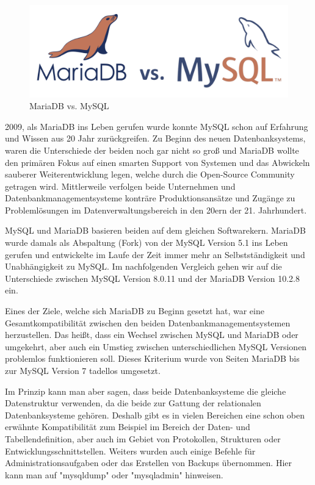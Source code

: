 
\begin{figure}[H]
    \centering
    \includegraphics[width=\textwidth]{media/MariaDB/mariavsmy.png}
    \caption{MariaDB vs. MySQL \cite{MariaVsMyBild}}
    \label{fig:MariavsMy}
\end{figure}

2009, als MariaDB ins Leben gerufen wurde konnte MySQL schon auf Erfahrung und Wissen aus 20 Jahr zurückgreifen. Zu Beginn des neuen Datenbanksystems, waren die Unterschiede der beiden noch gar nicht so groß und MariaDB wollte den primären Fokus auf einen smarten Support von Systemen und das Abwickeln sauberer Weiterentwicklung legen, welche durch die Open-Source Community getragen wird. Mittlerweile verfolgen beide Unternehmen und Datenbankmanagementsysteme konträre Produktionsansätze und Zugänge zu Problemlösungen im Datenverwaltungsbereich in den 20ern der 21. Jahrhundert. \cite{MariaVsMy}

MySQL und MariaDB basieren beiden auf dem gleichen Softwarekern. MariaDB wurde damals als Abspaltung (Fork) von der MySQL Version 5.1 ins Leben gerufen und entwickelte im Laufe der Zeit immer mehr an Selbstständigkeit und Unabhängigkeit zu MySQL. Im nachfolgenden Vergleich gehen wir auf die Unterschiede zwischen MySQL Version 8.0.11 und der MariaDB Version 10.2.8 ein. \cite{MariaVsMy}


Eines der Ziele, welche sich MariaDB zu Beginn gesetzt hat, war eine Gesamtkompatibilität zwischen den beiden Datenbankmanagementsystemen herzustellen. Das heißt, dass ein Wechsel zwischen MySQL und MariaDB oder umgekehrt, aber auch ein Umstieg zwischen unterschiedlichen MySQL Versionen problemlos funktionieren soll. Dieses Kriterium wurde von Seiten MariaDB bis zur MySQL Version 7 tadellos umgesetzt. \cite{MariaVsMy}

Im Prinzip kann man aber sagen, dass beide Datenbanksysteme die gleiche Datenstruktur verwenden, da die beide zur Gattung der relationalen Datenbanksysteme gehören. Deshalb gibt es in vielen Bereichen eine schon oben erwähnte Kompatibilität zum Beispiel im Bereich der Daten- und Tabellendefinition, aber auch im Gebiet von Protokollen, Strukturen oder Entwicklungsschnittstellen. Weiters wurden auch einige Befehle für Administrationsaufgaben oder das Erstellen von Backups übernommen. Hier kann man auf "mysqldump" oder "mysqladmin" hinweisen. \cite{MariaVsMy}

